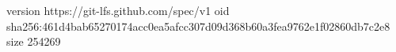 version https://git-lfs.github.com/spec/v1
oid sha256:461d4bab65270174acc0ea5afcc307d09d368b60a3fea9762e1f02860db7c2e8
size 254269
